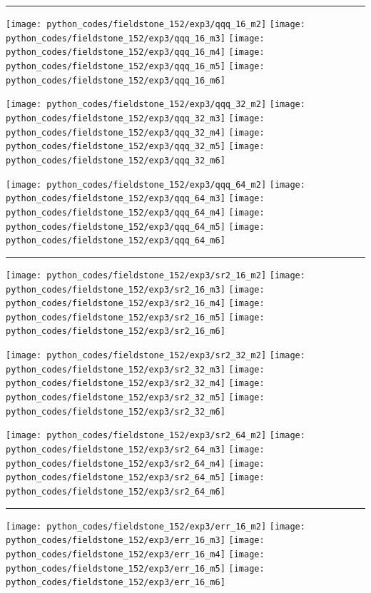 \hrule

\noindent
\texttt{[image: python\_codes/fieldstone\_152/exp3/qqq\_16\_m2]}
\texttt{[image: python\_codes/fieldstone\_152/exp3/qqq\_16\_m3]}
\texttt{[image: python\_codes/fieldstone\_152/exp3/qqq\_16\_m4]}
\texttt{[image: python\_codes/fieldstone\_152/exp3/qqq\_16\_m5]}
\texttt{[image: python\_codes/fieldstone\_152/exp3/qqq\_16\_m6]}

\noindent
\texttt{[image: python\_codes/fieldstone\_152/exp3/qqq\_32\_m2]}
\texttt{[image: python\_codes/fieldstone\_152/exp3/qqq\_32\_m3]}
\texttt{[image: python\_codes/fieldstone\_152/exp3/qqq\_32\_m4]}
\texttt{[image: python\_codes/fieldstone\_152/exp3/qqq\_32\_m5]}
\texttt{[image: python\_codes/fieldstone\_152/exp3/qqq\_32\_m6]}

\noindent
\texttt{[image: python\_codes/fieldstone\_152/exp3/qqq\_64\_m2]}
\texttt{[image: python\_codes/fieldstone\_152/exp3/qqq\_64\_m3]}
\texttt{[image: python\_codes/fieldstone\_152/exp3/qqq\_64\_m4]}
\texttt{[image: python\_codes/fieldstone\_152/exp3/qqq\_64\_m5]}
\texttt{[image: python\_codes/fieldstone\_152/exp3/qqq\_64\_m6]}

\hrule

\noindent
\texttt{[image: python\_codes/fieldstone\_152/exp3/sr2\_16\_m2]}
\texttt{[image: python\_codes/fieldstone\_152/exp3/sr2\_16\_m3]}
\texttt{[image: python\_codes/fieldstone\_152/exp3/sr2\_16\_m4]}
\texttt{[image: python\_codes/fieldstone\_152/exp3/sr2\_16\_m5]}
\texttt{[image: python\_codes/fieldstone\_152/exp3/sr2\_16\_m6]}

\noindent
\texttt{[image: python\_codes/fieldstone\_152/exp3/sr2\_32\_m2]}
\texttt{[image: python\_codes/fieldstone\_152/exp3/sr2\_32\_m3]}
\texttt{[image: python\_codes/fieldstone\_152/exp3/sr2\_32\_m4]}
\texttt{[image: python\_codes/fieldstone\_152/exp3/sr2\_32\_m5]}
\texttt{[image: python\_codes/fieldstone\_152/exp3/sr2\_32\_m6]}

\noindent
\texttt{[image: python\_codes/fieldstone\_152/exp3/sr2\_64\_m2]}
\texttt{[image: python\_codes/fieldstone\_152/exp3/sr2\_64\_m3]}
\texttt{[image: python\_codes/fieldstone\_152/exp3/sr2\_64\_m4]}
\texttt{[image: python\_codes/fieldstone\_152/exp3/sr2\_64\_m5]}
\texttt{[image: python\_codes/fieldstone\_152/exp3/sr2\_64\_m6]}

\hrule

\noindent
\texttt{[image: python\_codes/fieldstone\_152/exp3/err\_16\_m2]}
\texttt{[image: python\_codes/fieldstone\_152/exp3/err\_16\_m3]}
\texttt{[image: python\_codes/fieldstone\_152/exp3/err\_16\_m4]}
\texttt{[image: python\_codes/fieldstone\_152/exp3/err\_16\_m5]}
\texttt{[image: python\_codes/fieldstone\_152/exp3/err\_16\_m6]}

